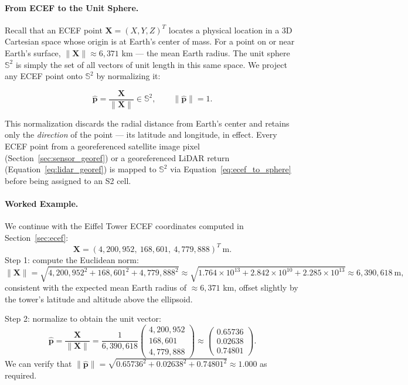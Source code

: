 \documentclass{book}
\begin{document}
\paragraph{From ECEF to the Unit Sphere.}

Recall that an ECEF point $\mathbf{X} = (X, Y, Z)^T$ locates a
physical location in a 3D Cartesian space whose origin is at Earth's
center of mass.  For a point on or near Earth's surface,
$\|\mathbf{X}\| \approx 6{,}371$ km --- the mean Earth radius.  The
unit sphere $\mathbb{S}^2$ is simply the set of all vectors of unit
length in this same space.  We project any ECEF point onto
$\mathbb{S}^2$ by normalizing it:

\begin{equation}
  \hat{\mathbf{p}} = \frac{\mathbf{X}}{\|\mathbf{X}\|}
    \in \mathbb{S}^2, \qquad \|\hat{\mathbf{p}}\| = 1.
  \label{eq:ecef_to_sphere}
\end{equation}

This normalization discards the radial distance from Earth's center
and retains only the \emph{direction} of the point --- its latitude
and longitude, in effect.  Every ECEF point from a georeferenced
satellite image pixel (Section~\ref{sec:sensor_georef}) or a
georeferenced LiDAR return (Equation~\ref{eq:lidar_georef}) is mapped
to $\mathbb{S}^2$ via Equation~\eqref{eq:ecef_to_sphere} before being
assigned to an S2 cell.

\paragraph{Worked Example.}

We continue with the Eiffel Tower ECEF coordinates computed in
Section~\ref{sec:ecef}:
\[
  \mathbf{X} = (4{,}200{,}952,\ 168{,}601,\ 4{,}779{,}888)^T\ \text{m}.
\]
Step 1: compute the Euclidean norm:
\[
  \|\mathbf{X}\| = \sqrt{4{,}200{,}952^2 + 168{,}601^2 + 4{,}779{,}888^2}
               \approx \sqrt{1.764 \times 10^{13} + 2.842 \times 10^{10}
               + 2.285 \times 10^{13}}
               \approx 6{,}390{,}618\ \text{m},
\]
consistent with the expected mean Earth radius of $\approx 6{,}371$
km, offset slightly by the tower's latitude and altitude above the
ellipsoid.

Step 2: normalize to obtain the unit vector:
\[
  \hat{\mathbf{p}} = \frac{\mathbf{X}}{\|\mathbf{X}\|}
  = \frac{1}{6{,}390{,}618}
    \begin{pmatrix}4{,}200{,}952\\168{,}601\\4{,}779{,}888\end{pmatrix}
  \approx
  \begin{pmatrix}0.65736\\0.02638\\0.74801\end{pmatrix}.
\]
We can verify that $\|\hat{\mathbf{p}}\| = \sqrt{0.65736^2 + 0.02638^2
+ 0.74801^2} \approx 1.000$ as required.
\end{document}
